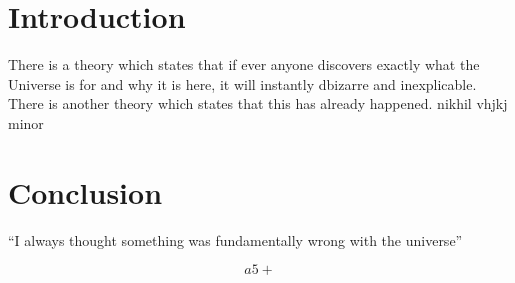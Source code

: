 \documentclass{article}
\title{}
\date{October 2018}
\begin{document}
\maketitle

\section{Introduction}
There is a theory which states that if ever anyone discovers exactly what the Universe is for and why it is here, it will instantly dbizarre and inexplicable.
There is another theory which states that this has already happened.
nikhil vhjkj minor

\section{Conclusion}
``I always thought something was fundamentally wrong with the universe'' \citep{adams1995hitchhiker}

\begin{equation}
    a5+
\end{equation}



\end{document}
